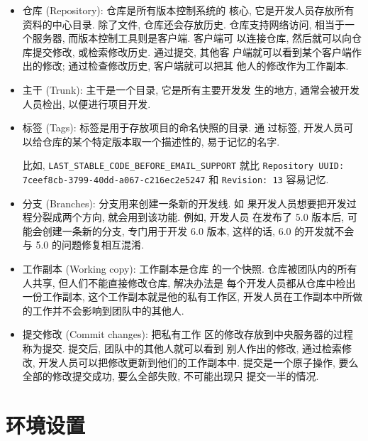 \documentclass[nofonts, oneside]{ctexbook}
\begin{document}
\begin{itemize}
  \item 仓库 (Repository): 仓库是所有版本控制系统的
      核心, 它是开发人员存放所有资料的中心目录. 除了文件, 仓库还会存放历史.
      仓库支持网络访问, 相当于一个服务器, 而版本控制工具则是客户端. 客户端可
      以连接仓库, 然后就可以向仓库提交修改, 或检索修改历史. 通过提交, 其他客
      户端就可以看到某个客户端作出的修改; 通过检查修改历史, 客户端就可以把其
      他人的修改作为工作副本.

  \item 主干 (Trunk): 主干是一个目录, 它是所有主要开发发
      生的地方, 通常会被开发人员检出, 以便进行项目开发.

  \item 标签 (Tags): 标签是用于存放项目的命名快照的目录. 通
      过标签, 开发人员可以给仓库的某个特定版本取一个描述性的, 易于记忆的名字.

      比如, \texttt{LAST\_STABLE\_CODE\_BEFORE\_EMAIL\_SUPPORT} 就比
      \texttt{Repository UUID: 7ceef8cb-3799-40dd-a067-c216ec2e5247} 和
      \texttt{Revision: 13} 容易记忆.

  \item 分支 (Branches): 分支用来创建一条新的开发线. 如
      果开发人员想要把开发过程分裂成两个方向, 就会用到该功能. 例如, 开发人员
      在发布了 5.0 版本后, 可能会创建一条新的分支, 专门用于开发 6.0 版本,
      这样的话, 6.0 的开发就不会与 5.0 的问题修复相互混淆.

  \item 工作副本 (Working copy): 工作副本是仓库
      的一个快照. 仓库被团队内的所有人共享, 但人们不能直接修改仓库, 解决办法是
      每个开发人员都从仓库中检出一份工作副本, 这个工作副本就是他的私有工作区,
      开发人员在工作副本中所做的工作并不会影响到团队中的其他人.

  \item 提交修改 (Commit changes): 把私有工作
      区的修改存放到中央服务器的过程称为提交. 提交后, 团队中的其他人就可以看到
      别人作出的修改, 通过检索修改, 开发人员可以把修改更新到他们的工作副本中.
      提交是一个原子操作, 要么全部的修改提交成功, 要么全部失败, 不可能出现只
      提交一半的情况.
\end{itemize}

\chapter{环境设置}
\label{chap:environment_setup}
\end{document}
